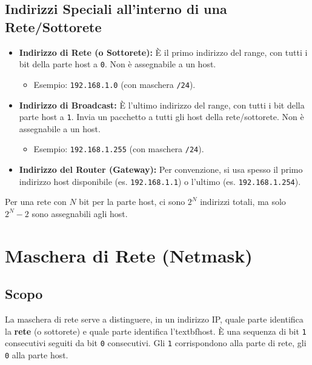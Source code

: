 \documentclass{article}
\begin{document}
\subsection{Indirizzi Speciali all'interno di una Rete/Sottorete}
\begin{itemize}
    \item \textbf{Indirizzo di Rete (o Sottorete):} È il primo indirizzo del range, con tutti i bit della parte host a \texttt{0}. Non è assegnabile a un host.
    \begin{itemize}
        \item Esempio: \texttt{192.168.1.0} (con maschera \texttt{/24}).
    \end{itemize}
    \item \textbf{Indirizzo di Broadcast:} È l'ultimo indirizzo del range, con tutti i bit della parte host a \texttt{1}. Invia un pacchetto a tutti gli host della rete/sottorete. Non è assegnabile a un host.
    \begin{itemize}
        \item Esempio: \texttt{192.168.1.255} (con maschera \texttt{/24}).
    \end{itemize}
    \item \textbf{Indirizzo del Router (Gateway):} Per convenzione, si usa spesso il primo indirizzo host disponibile (es. \texttt{192.168.1.1}) o l'ultimo (es. \texttt{192.168.1.254}).
\end{itemize}
Per una rete con $N$ bit per la parte host, ci sono $2^N$ indirizzi totali, ma solo $2^N - 2$ sono assegnabili agli host.

\section{Maschera di Rete (Netmask)}

\subsection{Scopo}
La maschera di rete serve a distinguere, in un indirizzo IP, quale parte identifica la \textbf{rete} (o sottorete) e quale parte identifica l'textbf{host}.
È una sequenza di bit \texttt{1} consecutivi seguiti da bit \texttt{0} consecutivi. Gli \texttt{1} corrispondono alla parte di rete, gli \texttt{0} alla parte host.
\end{document}
